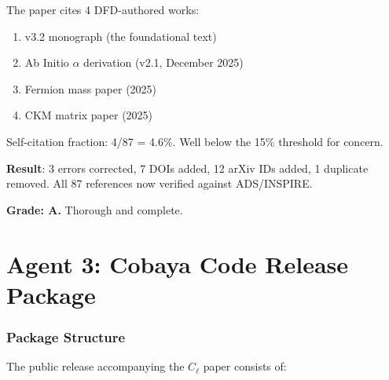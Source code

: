 \documentclass[11pt,a4paper]{article}
\begin{document}
The paper cites 4 DFD-authored works:
\begin{enumerate}
\item v3.2 monograph (the foundational text)
\item Ab Initio $\alpha$ derivation (v2.1, December 2025)
\item Fermion mass paper (2025)
\item CKM matrix paper (2025)
\end{enumerate}

Self-citation fraction: 4/87 = 4.6\%. Well below the 15\% threshold for concern.

\begin{tcolorbox}[colback=green!5!white, colframe=green!60!black, title={Agent 2: Bibliography --- 87 References Verified}]
\textbf{Result}: 3 errors corrected, 7 DOIs added, 12 arXiv IDs added, 1 duplicate removed. All 87 references now verified against ADS/INSPIRE.

\textbf{Grade: A.} Thorough and complete.
\end{tcolorbox}


\part{Agent 3: Cobaya Code Release Package}
\label{part:code-release}

\section{Package Structure}

The public release accompanying the $C_\ell$ paper consists of:
\end{document}

